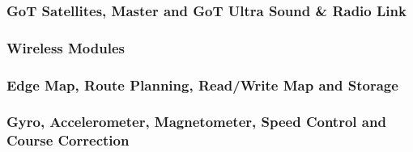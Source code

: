 
\subsubsection{GoT Satellites, Master and GoT Ultra Sound \& Radio Link}
\indent

\subsubsection{Wireless Modules}
\indent

\subsubsection{Edge Map, Route Planning, Read/Write Map and Storage}
\indent

\subsubsection{Gyro, Accelerometer, Magnetometer, Speed Control and Course Correction}
\indent

